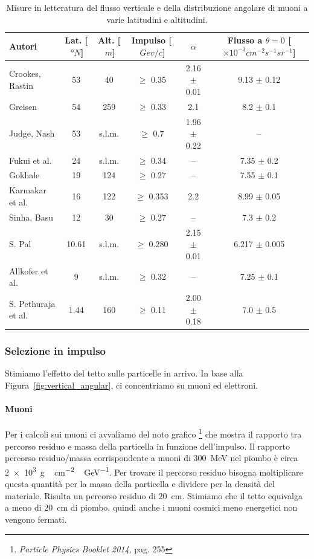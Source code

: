 \begin{table}
	\small
	\hspace{-3em}
	\begin{tabular}{lccccc}
		\hline
		Autori & Lat. [$\SI{}{\degree N}$]& Alt. [$\SI{}{m}$]& Impulso [$\SI{}{Gev/c}$] &$\alpha$ & \makecell{Flusso a $\theta=0$\\{}[$\times 10^{-3}\si{cm^{-2}s^{-1}sr^{-1}}$]}\\
		\hline
		Crookes, Rastin \cite{2} & 53 & 40 &$\ge$ 0.35 &2.16 $\pm$ 0.01 &9.13  $\pm$ 0.12\\
		Greisen \cite{3} \cite{4}& 54 & 259 &$\ge$ 0.33& 2.1 &8.2  $\pm$ 0.1\\
		Judge, Nash \cite{5}& 53 & s.l.m. & $\ge$ 0.7 & 1.96  $\pm$ 0.22 & --\\
		Fukui et al. \cite{6}& 24 & s.l.m.& $\ge$ 0.34 &-- &7.35 $\pm$ 0.2\\
		Gokhale \cite{7}& 19 & 124 &$\ge$ 0.27 &-- &7.55 $\pm$ 0.1\\
		Karmakar et al. \cite{8}& 16 & 122 &$\ge$ 0.353 &2.2 &8.99 $\pm$ 0.05\\
		Sinha, Basu \cite{9}& 12 & 30 &$\ge$ 0.27 &-- &7.3 $\pm$ 0.2\\
		S. Pal \cite{10}& 10.61 & s.l.m. &$\ge$ 0.280 &2.15 $\pm$ 0.01 &6.217 $\pm$ 0.005\\
		Allkofer et al. \cite{11}& 9 & s.l.m. &$\ge$ 0.32 &-- &7.25 $\pm$ 0.1\\
		S. Pethuraja et al. \cite{12}&1.44 & 160 &$\ge$ 0.11 &2.00 $\pm$ 0.18 & 7.0 $\pm$ 0.5\\
		\hline
	\end{tabular}
	\caption{\label{tab:letteratura}
	Misure in letteratura del flusso verticale e della distribuzione angolare di muoni
	a varie latitudini e altitudini.}
\end{table}

\subsubsection{Selezione in impulso}

Stimiamo l'effetto del tetto sulle particelle in arrivo.
In base alla Figura~\ref{fig:vertical_angular},
ci concentriamo su muoni ed elettroni.

\paragraph{Muoni}

Per i calcoli sui muoni ci avvaliamo del noto grafico%
\footnote{\emph{Particle Physics Booklet 2014}, pag. 255}
che mostra il rapporto tra percorso residuo e massa della particella in funzione dell'impulso.
Il rapporto percorso residuo/massa corrispondente a muoni di \SI{300}{MeV}
nel piombo è circa \SI{2e3}{g\,cm^{-2}\,GeV^{-1}}.
Per trovare il percorso residuo bisogna moltiplicare questa quantità per la massa della particella
e dividere per la densità del materiale.
Risulta un percorso residuo di \SI{20}{cm}.
Stimiamo che il tetto equivalga a meno di \SI{20}{cm} di piombo,
quindi anche i muoni cosmici meno energetici non vengono fermati.

